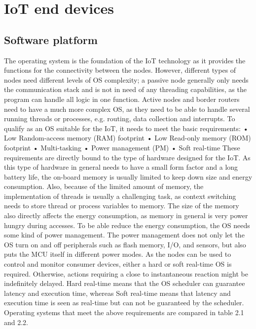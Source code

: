\section{IoT end devices}

\subsection{Software platform}


The operating system is the foundation of the IoT technology as it provides the functions for the connectivity between the nodes.
However,
	different types of nodes need different levels of OS complexity;
	a passive node generally only needs the communication stack and is not in need of any threading capabilities,
	as the program can handle all logic in one function.
Active nodes and border routers need to have a much more complex OS,
	as they need to be able to handle several running threads or processes,
	e.g.
routing,
	data collection and interrupts.
To qualify as an OS suitable for the IoT,
	it needs to meet the basic requirements:
	• Low Random-access memory (RAM) footprint 
	• Low Read-only memory (ROM) footprint 
	• Multi-tasking • Power management (PM) 
	• Soft real-time These requirements are directly bound to the type of hardware designed for the IoT.
As this type of hardware in general needs to have a small form factor and a long battery life,
	the on-board memory is usually limited to keep down size and energy consumption.
Also,
	because of the limited amount of memory,
	the implementation of threads is usually a challenging task,
	as context switching needs to store thread or process variables to memory.
The size of the memory also directly affects the energy consumption,
	as memory in general is very power hungry during accesses.
To be able reduce the energy consumption,
	the OS needs some kind of power management.
The power management does not only let the OS turn on and off peripherals such as flash memory,
	I/O,
	and sensors,
	but also puts the MCU itself in different power modes.
As the nodes can be used to control and monitor consumer devices,
	either a hard or soft real-time OS is required.
Otherwise,
	actions requiring a close to instantaneous reaction might be indefinitely delayed.
Hard real-time means that the OS scheduler can guarantee latency and execution time,
	whereas Soft real-time means that latency and execution time is seen as real-time but can not be guaranteed by the scheduler.
Operating systems that meet the above requirements are compared in table 2.1 and 2.2.

